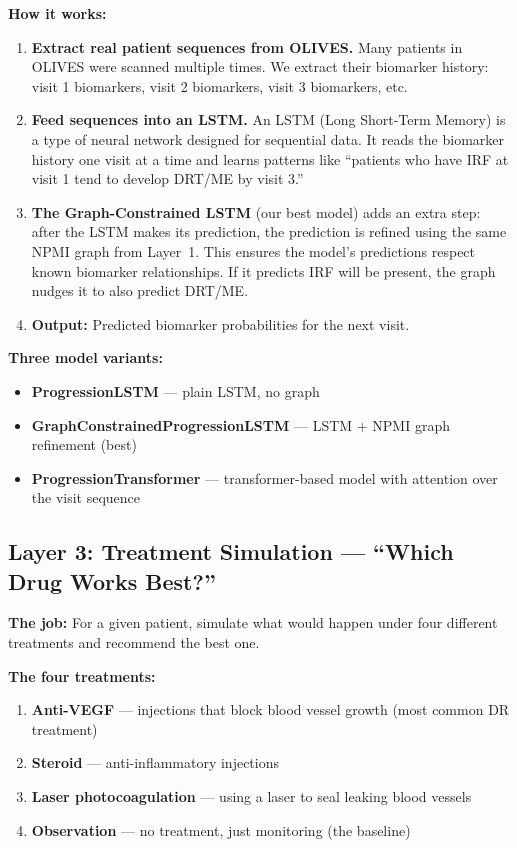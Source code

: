 \documentclass[12pt,a4paper]{article}
\begin{document}
\textbf{How it works:}

\begin{enumerate}
  \item \textbf{Extract real patient sequences from OLIVES.} Many patients in OLIVES were scanned multiple times. We extract their biomarker history: visit 1 biomarkers, visit 2 biomarkers, visit 3 biomarkers, etc.

  \item \textbf{Feed sequences into an LSTM.} An LSTM (Long Short-Term Memory) is a type of neural network designed for sequential data. It reads the biomarker history one visit at a time and learns patterns like ``patients who have IRF at visit 1 tend to develop DRT/ME by visit 3.''

  \item \textbf{The Graph-Constrained LSTM} (our best model) adds an extra step: after the LSTM makes its prediction, the prediction is refined using the same NPMI graph from Layer~1. This ensures the model's predictions respect known biomarker relationships. If it predicts IRF will be present, the graph nudges it to also predict DRT/ME.

  \item \textbf{Output:} Predicted biomarker probabilities for the next visit.
\end{enumerate}

\textbf{Three model variants:}
\begin{itemize}[nosep]
  \item \textbf{ProgressionLSTM} --- plain LSTM, no graph
  \item \textbf{GraphConstrainedProgressionLSTM} --- LSTM + NPMI graph refinement (best)
  \item \textbf{ProgressionTransformer} --- transformer-based model with attention over the visit sequence
\end{itemize}


\subsection{Layer 3: Treatment Simulation --- ``Which Drug Works Best?''}

\textbf{The job:} For a given patient, simulate what would happen under four different treatments and recommend the best one.

\textbf{The four treatments:}
\begin{enumerate}[nosep]
  \item \textbf{Anti-VEGF} --- injections that block blood vessel growth (most common DR treatment)
  \item \textbf{Steroid} --- anti-inflammatory injections
  \item \textbf{Laser photocoagulation} --- using a laser to seal leaking blood vessels
  \item \textbf{Observation} --- no treatment, just monitoring (the baseline)
\end{enumerate}
\end{document}
